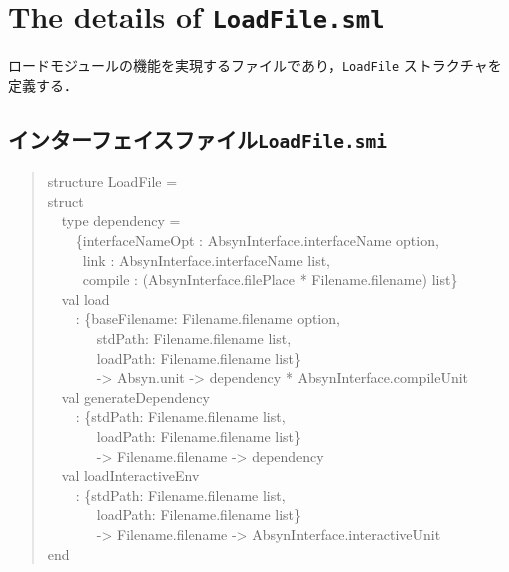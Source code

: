 \documentclass{jbook}
\newcommand{\txt}[2]{#2}
\newcommand{\code}[1]{\mbox{\large\tt #1}}
\newcommand{\myem}{\mbox{\ \ }}
\newenvironment{program}{\begin{quote}\begin{tt}}%
                        {\end{tt}\end{quote}}
\begin{document}
\section{\txt{\code{LoadFile.sml}の処理の詳細}{The details of \code{LoadFile.sml}}}
\ifjp%

	ロードモジュールの機能を実現するファイルであり，\code{LoadFile}
ストラクチャを定義する．

\subsection{インターフェイスファイル\code{LoadFile.smi}}
\begin{program}
structure LoadFile =\\
struct\\
\myem  type dependency =\\
\myem\myem      \{interfaceNameOpt : AbsynInterface.interfaceName option,\\
\myem\myem\      link : AbsynInterface.interfaceName list,\\
\myem\myem\      compile : (AbsynInterface.filePlace * Filename.filename) list\}\\
\myem  val load\\
\myem\myem      : \{baseFilename: Filename.filename option,\\
\myem\myem\myem\         stdPath: Filename.filename list,\\
\myem\myem\myem\         loadPath: Filename.filename list\}\\
\myem\myem\myem\       -> Absyn.unit -> dependency * AbsynInterface.compileUnit\\
\myem  val generateDependency\\
\myem\myem      : \{stdPath: Filename.filename list,\\
\myem\myem\myem\         loadPath: Filename.filename list\}\\
\myem\myem\myem\        -> Filename.filename -> dependency\\
\myem  val loadInteractiveEnv\\
\myem\myem      : \{stdPath: Filename.filename list,\\
\myem\myem\myem\        loadPath: Filename.filename list\}\\
\myem\myem\myem\        -> Filename.filename -> AbsynInterface.interactiveUnit\\
end
\end{program}
\end{document}
